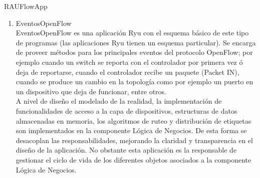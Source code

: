 \begin{subsubsection}{RAUFlowApp}





\begin{enumerate}

\item EventosOpenFlow\\
EventosOpenFlow es una aplicaci\'on Ryu con el esquema b\'asico de este tipo de programas (las aplicaciones Ryu tienen un esquema particular). Se encarga de proveer m\'etodos para los principales eventos del protocolo OpenFlow; por ejemplo cuando un switch se reporta con el controlador por primera vez \'o deja de reportarse, cuando el controlador recibe un paquete (Packet IN), cuando se produce un cambio en la topolog\'ia como por ejemplo un puerto en un dispositivo que deja de funcionar, entre otros.\\

A nivel de diseño el modelado de la realidad, la implementaci\'on de funcionalidades de acceso a la capa de dispositivos, estructuras de datos almacenadas en memoria, los algoritmos de ruteo y distribución de etiquetas son implementados en la componente Lógica de Negocios. De esta forma se desacoplan las responsabilidades, mejorando la claridad y transparencia en el diseño de la aplicaci\'on. No obstante esta aplicación es la responsable de gestionar el ciclo de vida de los diferentes objetos asociados a la componente Lógica de Negocios.
  

\end{enumerate}
\end{subsubsection}
